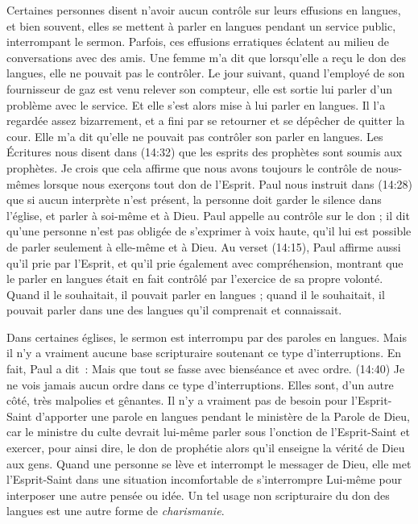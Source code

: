 Certaines personnes disent n'avoir aucun contrôle sur leurs effusions
 en langues, et bien souvent, elles se mettent à parler en langues
 pendant un service public, interrompant le sermon.
 Parfois, ces effusions erratiques éclatent au milieu de conversations
 avec des amis. Une femme m'a dit que lorsqu'elle a reçu le don des langues,
 elle ne pouvait pas le contrôler. Le jour suivant, quand l'employé de son
 fournisseur de gaz est venu relever son compteur, elle est sortie
 lui parler d'un problème avec le service. Et elle s'est alors mise
 à lui parler en langues. Il l'a regardée assez bizarrement,
 et a fini par se retourner et se dépêcher de quitter la cour.
 Elle m'a dit qu'elle ne pouvait pas contrôler son parler en langues.
 Les Écritures nous disent dans (14:32) que les esprits
 des prophètes sont soumis aux prophètes. Je crois que cela affirme
 que nous avons toujours le contrôle de nous-mêmes lorsque nous exerçons
 tout don de l'Esprit. Paul nous instruit dans (14:28)
 que si aucun interprète n'est présent, la personne doit garder
 le silence dans l'église, et parler à soi-même et à Dieu.
 Paul appelle au contrôle sur le don ; il dit qu'une personne n'est pas
 obligée de s'exprimer à voix haute, qu'il lui est possible de parler
 seulement à elle-même et à Dieu. Au verset (14:15),
 Paul affirme aussi qu'il prie par l'Esprit, et qu'il prie également
 avec compréhension, montrant que le parler en langues était en fait
 contrôlé par l'exercice de sa propre volonté. Quand il le souhaitait,
 il pouvait parler en langues ; quand il le souhaitait, il pouvait parler
 dans une des langues qu'il comprenait et connaissait.

Dans certaines églises, le sermon est interrompu par des paroles en langues.
 Mais il n'y a vraiment aucune base scripturaire soutenant ce type
 d'interruptions. En fait, Paul a dit~: \og Mais que tout se fasse
 avec bienséance et avec ordre. \fg{}(14:40)
 Je ne vois jamais aucun ordre dans ce type d'interruptions.
 Elles sont, d'un autre côté, très malpolies et gênantes.
 Il n'y a vraiment pas de besoin pour l'Esprit-Saint d'apporter une parole
 en langues pendant le ministère de la Parole de Dieu, car le ministre
 du culte devrait lui-même parler sous l'onction de l'Esprit-Saint
 et exercer, pour ainsi dire, le don de prophétie alors qu'il enseigne
 la vérité de Dieu aux gens. Quand une personne se lève et interrompt
 le messager de Dieu, elle met l'Esprit-Saint dans une situation
 incomfortable de s'interrompre Lui-même pour interposer une autre pensée
 ou idée. Un tel usage non scripturaire du don des langues est une autre
 forme de \emph{charismanie}.


